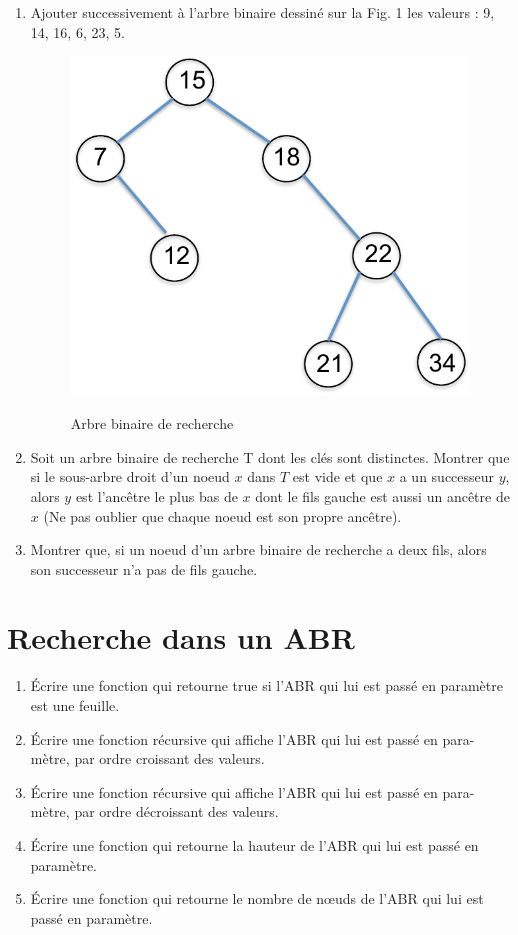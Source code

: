 \documentclass{article}[12pt]
\begin{document}
\begin{enumerate}
\item Ajouter successivement à l’arbre binaire dessiné sur la Fig. 1 les valeurs : 9, 14, 16, 6, 23, 5.
\begin{figure}[hbtp] 
  \centering
\includegraphics[scale =0.5] {ABR.pdf}\label{fig:abr} \caption{Arbre binaire de recherche}
\end{figure}
\item Soit un arbre binaire de recherche T dont les clés sont distinctes. Montrer que si le sous-arbre droit d'un noeud $x$ dans $T$ est vide et que $x$ a un successeur $y$, alors $y$ est l'ancêtre le plus bas de $x$ dont le fils gauche est aussi un ancêtre de $x$ (Ne pas oublier que chaque noeud est son propre ancêtre).
\item Montrer que, si un noeud d'un arbre binaire de recherche a deux fils, alors son successeur n'a pas de fils gauche.
\end{enumerate}


\section*{Recherche dans un ABR}
\begin{enumerate}
    \item Écrire une fonction qui retourne true si l’ABR qui lui est passé en paramètre
est une feuille.
    \item  Écrire une fonction récursive qui affiche l’ABR qui lui est passé en para-
mètre, par ordre croissant des valeurs.
    \item Écrire une fonction récursive qui affiche l’ABR qui lui est passé en para-
mètre, par ordre décroissant des valeurs.
    \item Écrire une fonction qui retourne la hauteur de l’ABR qui lui est passé en
paramètre.
\item Écrire une fonction qui retourne le nombre de nœuds de l’ABR qui lui est
passé en paramètre.
\end{enumerate}
\end{document}
